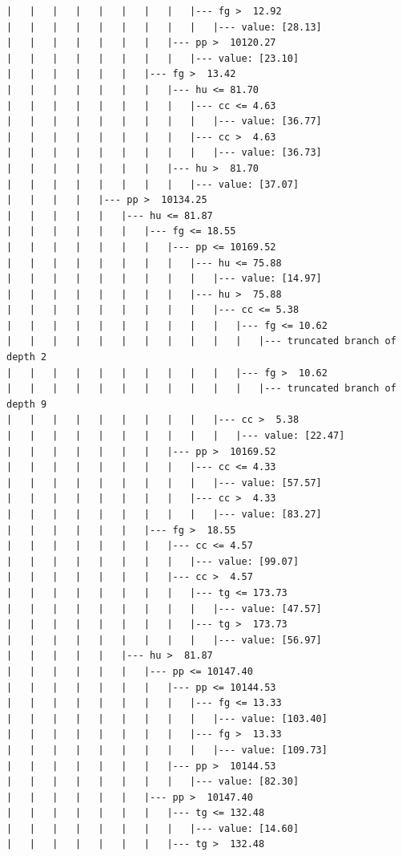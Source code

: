 \documentclass[UTF8, a4paper]{ctexart}
\begin{document}
\begin{lstlisting}
|   |   |   |   |   |   |   |   |--- fg >  12.92
|   |   |   |   |   |   |   |   |   |--- value: [28.13]
|   |   |   |   |   |   |   |--- pp >  10120.27
|   |   |   |   |   |   |   |   |--- value: [23.10]
|   |   |   |   |   |   |--- fg >  13.42
|   |   |   |   |   |   |   |--- hu <= 81.70
|   |   |   |   |   |   |   |   |--- cc <= 4.63
|   |   |   |   |   |   |   |   |   |--- value: [36.77]
|   |   |   |   |   |   |   |   |--- cc >  4.63
|   |   |   |   |   |   |   |   |   |--- value: [36.73]
|   |   |   |   |   |   |   |--- hu >  81.70
|   |   |   |   |   |   |   |   |--- value: [37.07]
|   |   |   |   |--- pp >  10134.25
|   |   |   |   |   |--- hu <= 81.87
|   |   |   |   |   |   |--- fg <= 18.55
|   |   |   |   |   |   |   |--- pp <= 10169.52
|   |   |   |   |   |   |   |   |--- hu <= 75.88
|   |   |   |   |   |   |   |   |   |--- value: [14.97]
|   |   |   |   |   |   |   |   |--- hu >  75.88
|   |   |   |   |   |   |   |   |   |--- cc <= 5.38
|   |   |   |   |   |   |   |   |   |   |--- fg <= 10.62
|   |   |   |   |   |   |   |   |   |   |   |--- truncated branch of depth 2
|   |   |   |   |   |   |   |   |   |   |--- fg >  10.62
|   |   |   |   |   |   |   |   |   |   |   |--- truncated branch of depth 9
|   |   |   |   |   |   |   |   |   |--- cc >  5.38
|   |   |   |   |   |   |   |   |   |   |--- value: [22.47]
|   |   |   |   |   |   |   |--- pp >  10169.52
|   |   |   |   |   |   |   |   |--- cc <= 4.33
|   |   |   |   |   |   |   |   |   |--- value: [57.57]
|   |   |   |   |   |   |   |   |--- cc >  4.33
|   |   |   |   |   |   |   |   |   |--- value: [83.27]
|   |   |   |   |   |   |--- fg >  18.55
|   |   |   |   |   |   |   |--- cc <= 4.57
|   |   |   |   |   |   |   |   |--- value: [99.07]
|   |   |   |   |   |   |   |--- cc >  4.57
|   |   |   |   |   |   |   |   |--- tg <= 173.73
|   |   |   |   |   |   |   |   |   |--- value: [47.57]
|   |   |   |   |   |   |   |   |--- tg >  173.73
|   |   |   |   |   |   |   |   |   |--- value: [56.97]
|   |   |   |   |   |--- hu >  81.87
|   |   |   |   |   |   |--- pp <= 10147.40
|   |   |   |   |   |   |   |--- pp <= 10144.53
|   |   |   |   |   |   |   |   |--- fg <= 13.33
|   |   |   |   |   |   |   |   |   |--- value: [103.40]
|   |   |   |   |   |   |   |   |--- fg >  13.33
|   |   |   |   |   |   |   |   |   |--- value: [109.73]
|   |   |   |   |   |   |   |--- pp >  10144.53
|   |   |   |   |   |   |   |   |--- value: [82.30]
|   |   |   |   |   |   |--- pp >  10147.40
|   |   |   |   |   |   |   |--- tg <= 132.48
|   |   |   |   |   |   |   |   |--- value: [14.60]
|   |   |   |   |   |   |   |--- tg >  132.48

\end{lstlisting}
\end{document}
